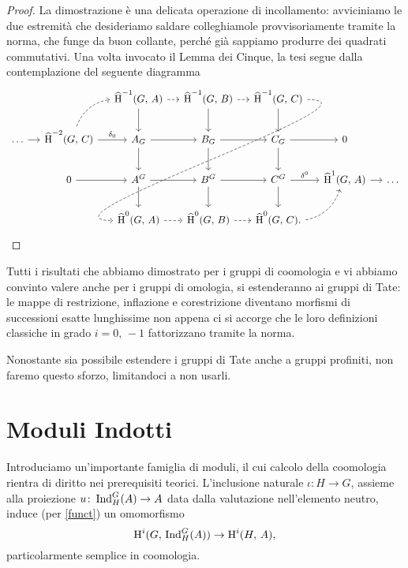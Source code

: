 \begin{proof}
	La dimostrazione è una delicata operazione di incollamento: avviciniamo le due estremità che desideriamo saldare colleghiamole provvisoriamente tramite la norma, che funge da buon collante, perché già sappiamo produrre dei quadrati commutativi. Una volta invocato il Lemma dei Cinque, la tesi segue dalla contemplazione del seguente diagramma
	\[\begin{tikzcd}[column sep = small]
	&& \Hhh^{-1}(G, \, A) \dar \rar[dashed]
	& \Hhh^{-1}(G, \, B) \dar \rar[dashed]
	& \Hhh^{-1}(G, \, C) \dar \ar[out=0, in=180, looseness=1, dashed]{dddll} %
	&& \\
	\dots \rar
	& \Hhh^{-2}(G, \, C) \rar["\delta_0"] \arrow[ur, dashed, bend left = 30]
	& A_G \rar \dar 
	& B_G \rar \arrow[d]
	& C_G \rar \dar
	& 0 & \\
	& 0 \rar
	&A^G \rar\dar
	& B^G \rar\dar
	& C^G \rar["\delta^0"]\dar
	& \Hhh^1(G, \, A) \rar
	& \dots \\
	&& \Hhh^{0}(G, \, A) \rar[dashed]
	& \Hhh^{0}(G, \, B)  \rar[dashed]
	& \Hhh^{0}(G, \, C). \arrow[ur, dashed, bend right = 30]
	&&
	\end{tikzcd}\]
\end{proof}

Tutti i risultati che abbiamo dimostrato per i gruppi di coomologia e vi abbiamo convinto valere anche per i gruppi di omologia, si estenderanno ai gruppi di Tate: le mappe di restrizione, inflazione e corestrizione diventano morfismi di successioni esatte lunghissime non appena ci si accorge che le loro definizioni classiche in grado $ i = 0,\, -1 $ fattorizzano tramite la norma.\\

\begin{profinite}
	Nonostante sia possibile estendere i gruppi di Tate anche a gruppi profiniti, non faremo questo sforzo, limitandoci a non usarli.
\end{profinite}

\section{Moduli Indotti}
Introduciamo un'importante famiglia di moduli, il cui calcolo della coomologia rientra di diritto nei prerequisiti teorici. L'inclusione naturale $ \iota \colon H \to G $, assieme alla proiezione $ u \colon \operatorname{Ind}_H^G(A) \to A $ data dalla valutazione nell'elemento neutro, induce (per \ref{funct}) un omomorfismo \[ \operatorname{H}^i(G, \, \operatorname{Ind}_H^G(A)) \to \operatorname{H}^i(H, \, A), \]
particolarmente semplice in coomologia.


